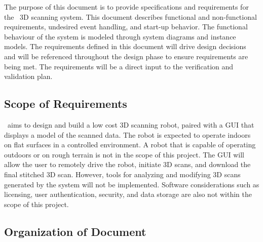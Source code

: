 \documentclass[12pt]{article}
\begin{document}
  The purpose of this document is to provide specifications and requirements for the \progname\ 3D scanning system. This document describes functional and non-functional requirements, undesired event handling, and start-up behavior. The functional behaviour of the system is modeled through system diagrams and instance models. The requirements defined in this document will drive design decisions and will be referenced throughout the design phase to ensure requirements are being met. The requirements will be a direct input to the verification and validation plan.

\subsection{Scope of Requirements} 
\label{sec_Scope}



\progname\ aims to design and build a low cost 3D scanning robot, paired with a GUI that displays a model of the scanned data.
The robot is expected to operate indoors on flat surfaces in a controlled environment.
A robot that is capable of operating outdoors or on rough terrain is not in the scope of this project.
The GUI will allow the user to remotely drive the robot, initiate 3D scans, and download the final stitched 3D scan.
However, tools for analyzing and modifying 3D scans generated by the system will not be implemented.
Software considerations such as licensing, user authentication, security, and data storage are also not within the scope of this project.

\subsection{Organization of Document}
\end{document}
